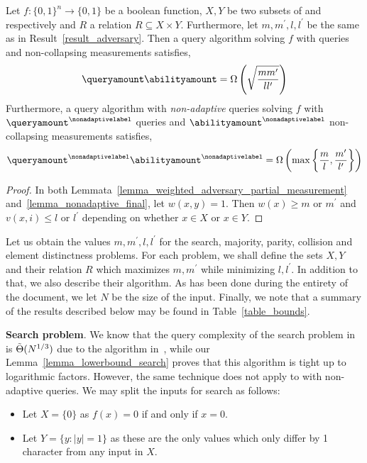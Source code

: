 \begin{corollary}\label{corollary_basic_adversary}
    Let $f:\{0,1\}^n\rightarrow \{0,1\}$ be a boolean function, $X,Y$ be two subsets of  and  respectively and $R$ a relation $R\subseteq X \times Y$. Furthermore, let $m,m^\prime, l, l^\prime$ be the same as in Result~\ref{result_adversary}. Then a \pdqpname query algorithm solving $f$ with \queryamount queries and \abilityamount non-collapsing measurements satisfies,
    \begin{align*}
        \queryamount\abilityamount = \Omega\left( \sqrt{\frac{mm^\prime}{ll^\prime}} \right)
    \end{align*}
    Furthermore, a \pdqpname query algorithm with \emph{non-adaptive} queries solving $f$ with $\queryamount^{\nonadaptivelabel}$ queries and $\abilityamount^{\nonadaptivelabel}$ non-collapsing measurements satisfies,
    \begin{align*}
        \queryamount^{\nonadaptivelabel} \abilityamount^{\nonadaptivelabel} = \Omega \left( \max\left\{\frac{m}{l}, \frac{m^\prime}{l^\prime}\right\}\right)
    \end{align*}
\end{corollary}
\begin{proof}
    In both Lemmata~\ref{lemma_weighted_adversary_partial_measurement} and~\ref{lemma_nonadaptive_final}, let $w(x,y) = 1$. Then $w(x)\geq m$ or $m^\prime$ and $v(x,i)\leq l$ or $l^\prime$ depending on whether $x\in X$ or $x\in Y$.
\end{proof}

Let us obtain the values $m,m^\prime, l, l^\prime$ for the search, majority, parity, collision and element distinctness problems. For each problem, we shall define the sets $X, Y$ and their relation $R$ which maximizes $m, m^\prime$ while minimizing $l, l^\prime$. In addition to that, we also describe their algorithm. As has been done during the entirety of the document, we let $N$ be the size of the input. Finally, we note that a summary of the results described below may be found in Table~\ref{table_bounds}.

\textbf{Search problem}. We know that the query complexity of the search problem in \pdqpname is $\Tilde{\Theta}(N^{1/3})$ due to the algorithm in~\cite{space_above_bqp}, while our Lemma~\ref{lemma_lowerbound_search} proves that this algorithm is tight up to logarithmic factors. However, the same technique does not apply to \pdqpname with non-adaptive queries. We may split the inputs for search as follows:
\begin{itemize}
    \item Let $X=\{0\}$ as $f(x)=0$ if and only if $x=0$.
    \item Let $Y=\{y: |y|=1\}$ as these are the only values which only differ by 1 character from any input in $X$.
\end{itemize}


